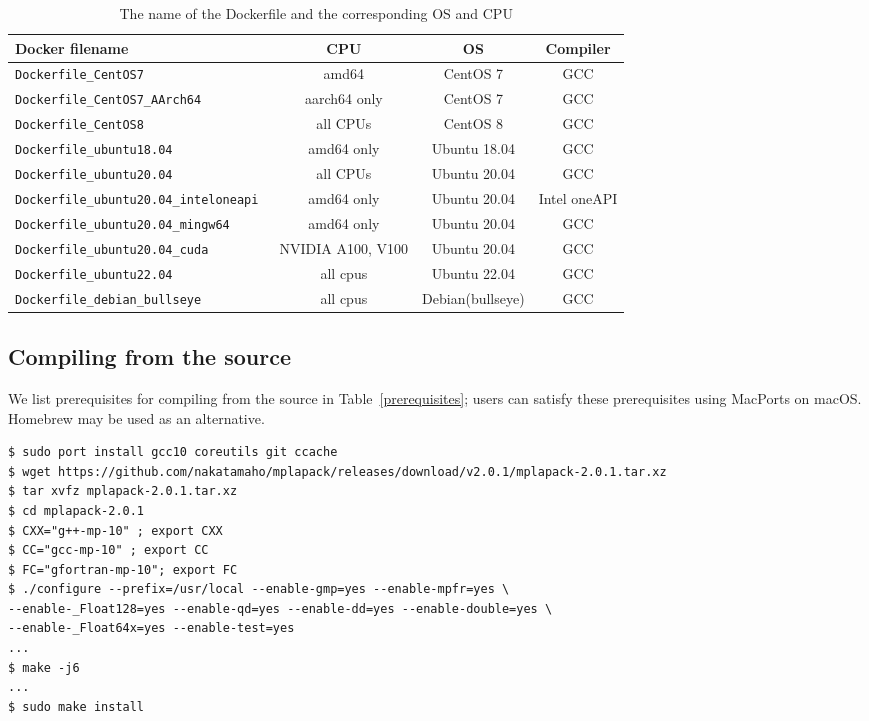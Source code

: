 \documentclass[12pt]{article}
\begin{document}
\begin{table}
\caption{The name of the Dockerfile and the corresponding OS and CPU}\label{dockerfiles}
\begin{center}
\begin{tabular}{l|c|c|c}
Docker filename                      & CPU          & OS            & Compiler \\ \hline
\tt Dockerfile\_CentOS7              & amd64        & CentOS 7      & GCC \\
\tt Dockerfile\_CentOS7\_AArch64     & aarch64 only & CentOS 7      & GCC\\
\tt Dockerfile\_CentOS8              & all CPUs     & CentOS 8      & GCC \\
\tt Dockerfile\_ubuntu18.04          & amd64 only   & Ubuntu 18.04  & GCC  \\
\tt Dockerfile\_ubuntu20.04          & all CPUs     & Ubuntu 20.04  & GCC\\
\tt Dockerfile\_ubuntu20.04\_inteloneapi & amd64 only   & Ubuntu 20.04  & Intel oneAPI \\
\tt Dockerfile\_ubuntu20.04\_mingw64 & amd64 only   & Ubuntu 20.04     & GCC \\
\tt Dockerfile\_ubuntu20.04\_cuda    & NVIDIA A100, V100 & Ubuntu 20.04     & GCC \\
\tt Dockerfile\_ubuntu22.04          & all cpus     & Ubuntu 22.04     & GCC \\
\tt Dockerfile\_debian\_bullseye     & all cpus     & Debian(bullseye) & GCC \\ \hline
\end{tabular}
\end{center}
\end{table}

\subsection{Compiling from the source}
We list prerequisites for compiling from the source in Table~\ref{prerequisites}; users can satisfy these prerequisites using MacPorts on macOS. Homebrew may be used as an alternative.

{\footnotesize
\begin{verbatim}
$ sudo port install gcc10 coreutils git ccache
$ wget https://github.com/nakatamaho/mplapack/releases/download/v2.0.1/mplapack-2.0.1.tar.xz
$ tar xvfz mplapack-2.0.1.tar.xz
$ cd mplapack-2.0.1
$ CXX="g++-mp-10" ; export CXX
$ CC="gcc-mp-10" ; export CC
$ FC="gfortran-mp-10"; export FC
$ ./configure --prefix=/usr/local --enable-gmp=yes --enable-mpfr=yes \
--enable-_Float128=yes --enable-qd=yes --enable-dd=yes --enable-double=yes \
--enable-_Float64x=yes --enable-test=yes
...
$ make -j6
...
$ sudo make install
\end{verbatim}
}
\end{document}
